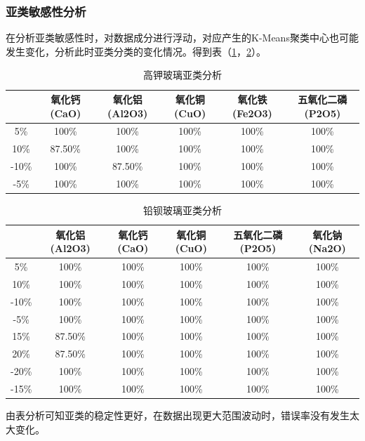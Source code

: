 \documentclass{my_paper}
\begin{document}
\subsubsection{亚类敏感性分析}
在分析亚类敏感性时，对数据成分进行浮动，对应产生的K-Means聚类中心也可能发生变化，分析此时亚类分类的变化情况。得到表（\ref{sen3}，\ref{sen4}）。
\newpage 
\begin{longtable}{cccccc}
\caption{高钾玻璃亚类分析}
\label{sen3} \\
\toprule
& 氧化钙(CaO) & 氧化铝(Al2O3) & 氧化铜(CuO) & 氧化铁(Fe2O3) & 五氧化二磷(P2O5) \\\midrule
5\%   & 100\%    & 100\%      & 100\%    & 100\%      & 100\%       \\
10\%  & 87.50\%  & 100\%      & 100\%    & 100\%      & 100\%       \\
-10\% & 100\%    & 87.50\%    & 100\%    & 100\%      & 100\%       \\
-5\%  & 100\%    & 100\%      & 100\%    & 100\%      & 100\%       \\
\bottomrule
\end{longtable}  

\begin{longtable}{cccccc}
  \caption{铅钡玻璃亚类分析}
  \label{sen4} \\
  \toprule
  & 氧化铝(Al2O3) & 氧化钙(CaO) & 氧化铜(CuO) & 五氧化二磷(P2O5) & 氧化钠(Na2O) \\\midrule
  5\%   & 100\%      & 100\%    & 100\%    & 100\%       & 100\%     \\
  10\%  & 100\%      & 100\%    & 100\%    & 100\%       & 100\%     \\
  -10\% & 100\%      & 100\%    & 100\%    & 100\%       & 100\%     \\
  -5\%  & 100\%      & 100\%    & 100\%    & 100\%       & 100\%     \\
  15\%  & 87.50\%    & 100\%    & 100\%    & 100\%       & 100\%     \\
  20\%  & 87.50\%    & 100\%    & 100\%    & 100\%       & 100\%     \\
  -20\% & 100\%      & 100\%    & 100\%    & 100\%       & 100\%     \\
  -15\% & 100\%      & 100\%    & 100\%    & 100\%       & 100\%     \\
  \bottomrule
  \end{longtable}  

  由表分析可知亚类的稳定性更好，在数据出现更大范围波动时，错误率没有发生太大变化。
\end{document}
